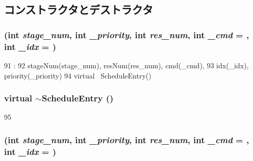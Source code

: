 \subsection{コンストラクタとデストラクタ}
\hypertarget{structThePipeline_1_1ScheduleEntry_a39f5765d7267f4eed1690e3c3476d2ef}{
\subsubsection[{ScheduleEntry}]{ (int {\em stage\_\-num}, \/  int {\em \_\-priority}, \/  int {\em res\_\-num}, \/  int {\em \_\-cmd} = {}, \/  int {\em \_\-idx} = {})}}
\label{structThePipeline_1_1ScheduleEntry_a39f5765d7267f4eed1690e3c3476d2ef}



\begin{DoxyCode}
91                                     :
92             stageNum(stage_num), resNum(res_num), cmd(_cmd),
93             idx(_idx), priority(_priority)
94         { }
        virtual ~ScheduleEntry(){}
\end{DoxyCode}
\hypertarget{structThePipeline_1_1ScheduleEntry_af29b983aaf5026d418a9e6a126388bb1}{
\subsubsection[{$\sim$ScheduleEntry}]{\setlength{\rightskip}{0pt plus 5cm}virtual $\sim${\bf ScheduleEntry} ()}}
\label{structThePipeline_1_1ScheduleEntry_af29b983aaf5026d418a9e6a126388bb1}



\begin{DoxyCode}
95 {}
\end{DoxyCode}
\hypertarget{structThePipeline_1_1ScheduleEntry_a39f5765d7267f4eed1690e3c3476d2ef}{
\subsubsection[{ScheduleEntry}]{ (int {\em stage\_\-num}, \/  int {\em \_\-priority}, \/  int {\em res\_\-num}, \/  int {\em \_\-cmd} = {}, \/  int {\em \_\-idx} = {})}}
\label{structThePipeline_1_1ScheduleEntry_a39f5765d7267f4eed1690e3c3476d2ef}



